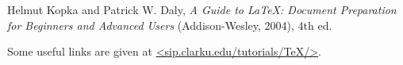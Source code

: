 \documentclass[prb,11pt]{revtex4-1}
\begin{document}
\begin{thebibliography}{5}

Helmut Kopka and Patrick W. Daly, \textsl{A Guide to
\LaTeX: Document Preparation for Beginners and Advanced Users} (Addison-Wesley, 2004), 4th ed.

Some useful links are
given at \url{<sip.clarku.edu/tutorials/TeX/>}.

\end{thebibliography}
\end{document}
